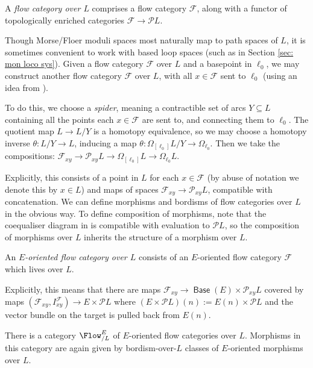 \documentclass{TPmod}
\DeclareMathOperator{\Base}{\mathsf{Base}}
\newcommand{\cF}{\mathcal{F}}
\newcommand{\cP}{\mathcal{P}}
\numberwithin{equation}{section}
\begin{document}
\begin{defn}
A \emph{flow category over $L$} comprises a flow category $\cF$, along with a functor of topologically enriched categories $\cF \to \cP L$.  
\end{defn}
\begin{rmk}\label{rmk:spid}
    Though Morse/Floer moduli spaces most naturally map to path spaces of $L$, it is sometimes convenient to work with based loop spaces (such as in Section \ref{sec: mon loco sys}). Given a flow category $\cF$ over $L$ and a basepoint in $\ell_0$, we may construct another flow category $\cF$ over $L$, with all $x \in \cF$ sent to $\ell_0$ (using an idea from \cite{Barraud-Cornea}).
    
    To do this, we choose a \emph{spider}, meaning a contractible set of arcs $Y \subseteq L$ containing all the points each $x \in \cF$ are sent to, and connecting them to $\ell_0$. The quotient map $L \to L/Y$ is a homotopy equivalence, so we may choose a homotopy inverse $\theta: L/Y \to L$, inducing a map $\theta: \Omega_{[\ell_0]} L/Y \to \Omega_{\ell_0}$. Then we take the compositions: $\cF_{xy} \to \cP_{xy}L \to \Omega_{[\ell_0]}L \to \Omega_{\ell_0}L$.
\end{rmk}

  Explicitly, this consists of a point in $L$ for each $x \in \cF$ (by abuse of notation we denote this by $x \in L$) and maps of spaces $\cF_{xy} \to \cP_{xy}L$, compatible with concatenation.  We can define morphisms and bordisms of flow categories over $L$ in the obvious way. To define composition of morphisms, note that the coequaliser diagram in \cite[Equation (33)]{PS2} is compatible with evaluation to $\cP L$, so the composition of morphisms over $L$ inherits the structure of a morphism over $L$.


    \begin{defn}
        An \emph{$E$-oriented flow category over $L$} consists of an $E$-oriented flow category $\cF$ which lives over $L$.
    \end{defn}
 Explicitly, this means that there are maps  $\cF_{xy} \to \Base(E)\times \cP_{xy} L$ covered by maps $(\cF_{xy},I^{\cF}_{xy}) \to E\times \cP L$ where $(E\times \cP L)(n) := E(n) \times \cP L$ and the vector bundle on the target is pulled back from $E(n)$. 


       
      

    There is a category $\Flow^{E}_{/L}$ of $E$-oriented flow categories over $L$. Morphisms in this category are again given by bordism-over-$L$ classes of $E$-oriented morphisms over $L$. 
    
\end{document}
